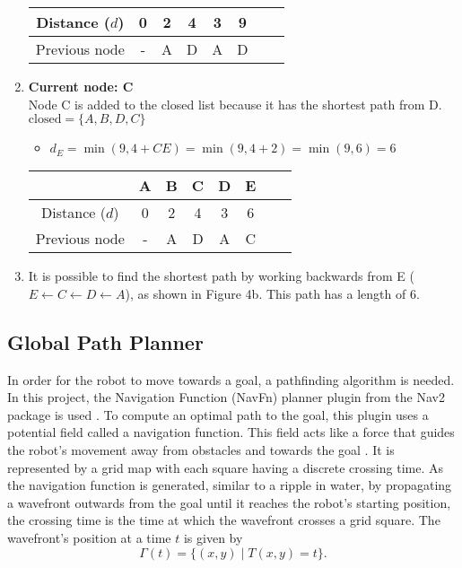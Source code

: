 \begin{enumerate}
\begin{tabular}{ |c|c|c|c|c|c|c|c| }
              Distance ($d$) & 0 & 2 & 4 & 3 & 9 \\
              \hline
              Previous node  & - & A & D & A & D \\
              \hline
          \end{tabular}
    \item \textbf{Current node: C}\\
          Node C is added to the closed list because it has the shortest path from D.\\
          $\text{closed} = \{A,B,D,C\}$
          \begin{itemize}
              \item $d_E=\min(9,4+CE)=\min(9,4+2)=\min(9,6)=6$
          \end{itemize}
          \def\arraystretch{1.5}
          \begin{tabular}{ |c|c|c|c|c|c|c|c| }
              \hline
                             & A & B & C & D & E \\
              \hline
              Distance ($d$) & 0 & 2 & 4 & 3 & 6 \\
              \hline
              Previous node  & - & A & D & A & C \\
              \hline
          \end{tabular}
    \item It is possible to find the shortest path by working backwards from E ($E \leftarrow C \leftarrow D \leftarrow A$), as shown in Figure 4b. This path has a length of 6.
\end{enumerate}

\subsection{Global Path Planner} \label{global-planner}
In order for the robot to move towards a goal, a pathfinding algorithm is needed. In this project, the Navigation Function (NavFn) planner plugin from the Nav2 package is used \parencite{NavFnPlannerNav2}. To compute an optimal path to the goal, this plugin uses a potential field called a navigation function. This field acts like a force that guides the robot's movement away from obstacles and towards the goal \parencite{philippsenInterpolatedDynamicNavigation2005}. It is represented by a grid map with each square having a discrete crossing time. As the navigation function is generated, similar to a ripple in water, by propagating a wavefront outwards from the goal until it reaches the robot's starting position, the crossing time is the time at which the wavefront crosses a grid square. The wavefront's position at a time $t$ is given by
\[
    \Gamma (t)=\{(x,y) \mid T(x,y)=t\}.
\]

